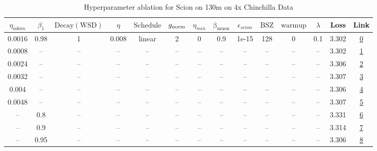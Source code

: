 \begin{table}[H]
\centering
\caption{Hyperparameter ablation for Scion on 130m on 4x Chinchilla Data}
\label{tab:ablation_scion_130m_on_4x_chinchilla_data}
\begin{tabular}{cccccccccccccc}
\toprule
$\eta_{adam}$ & $\beta_1$ & $\mathrm{Decay (WSD)}$ & $\eta$ & $\mathrm{Schedule}$ & $g_{\mathrm{norm}}$ & $\eta_{min}$ & $\mathrm{\beta_{muon}}$ & $\epsilon_{scion}$ & $\mathrm{BSZ}$ & $\mathrm{warmup}$ & $\lambda$ & Loss & Link \\
\midrule
0.0016 & 0.98 & 1 & 0.008 & linear & 2 & 0 & 0.9 & 1e-15 & 128 & 0 & 0.1 & 3.302 & \href{https://wandb.ai/marin-community/optimizer-scaling/runs/sweep-130m-10B-scion9698d1lr0.008-wd0.1-minlr0-warmup0-b10.98-gn-7282fc}{0} \\
\midrule
0.0008 & -- & -- & -- & -- & -- & -- & -- & -- & -- & -- & -- & 3.302 & \href{https://wandb.ai/marin-community/optimizer-scaling/runs/sweep-130m-10B-scion9d476clr0.008-wd0.1-minlr0-warmup0-b10.98-gn-6116a3}{1} \\
0.0024 & -- & -- & -- & -- & -- & -- & -- & -- & -- & -- & -- & 3.306 & \href{https://wandb.ai/marin-community/optimizer-scaling/runs/sweep-130m-10B-sciona8b5aalr0.008-wd0.1-minlr0-warmup0-b10.98-gn-e47df7}{2} \\
0.0032 & -- & -- & -- & -- & -- & -- & -- & -- & -- & -- & -- & 3.307 & \href{https://wandb.ai/marin-community/optimizer-scaling/runs/sweep-130m-10B-scionb02b9dlr0.008-wd0.1-minlr0-warmup0-b10.98-gn-c39e4a}{3} \\
0.004 & -- & -- & -- & -- & -- & -- & -- & -- & -- & -- & -- & 3.306 & \href{https://wandb.ai/marin-community/optimizer-scaling/runs/sweep-130m-10B-scion38a308lr0.008-wd0.1-minlr0-warmup0-b10.98-gn-1b6e87}{4} \\
0.0048 & -- & -- & -- & -- & -- & -- & -- & -- & -- & -- & -- & 3.307 & \href{https://wandb.ai/marin-community/optimizer-scaling/runs/sweep-130m-10B-scion0eab92lr0.008-wd0.1-minlr0-warmup0-b10.98-gn-3e5a9b}{5} \\
-- & 0.8 & -- & -- & -- & -- & -- & -- & -- & -- & -- & -- & 3.331 & \href{https://wandb.ai/marin-community/optimizer-scaling/runs/sweep-130m-10B-scion40e7b5lr0.008-wd0.1-minlr0-warmup0-b10.8-gn2-eda693}{6} \\
-- & 0.9 & -- & -- & -- & -- & -- & -- & -- & -- & -- & -- & 3.314 & \href{https://wandb.ai/marin-community/optimizer-scaling/runs/sweep-130m-10B-scion51153elr0.008-wd0.1-minlr0-warmup0-b10.9-gn2-da2cf1}{7} \\
-- & 0.95 & -- & -- & -- & -- & -- & -- & -- & -- & -- & -- & 3.306 & \href{https://wandb.ai/marin-community/optimizer-scaling/runs/sweep-130m-10B-sciond34ea1lr0.008-wd0.1-minlr0-warmup0-b10.95-gn-2dd73c}{8} \\

\end{tabular}
\end{table}
